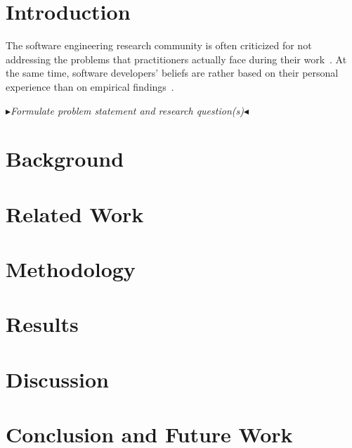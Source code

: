 \documentclass[
  pdftex,            %
  12pt,              %
  a4paper,           %
  parskip=relative,  %
  twoside,           %
  footinclude=false, %
  footheight=0mm,    %
  toc=bibliography,  %
  toc=listof         %
]{scrbook}           %
\theoremstyle{definitiontight}
\newcommand{\quotemarks}[1]{{\bfseries{#1}}}
\newenvironment{chapter-quotation}[1]
  {
    \begin{quotation}                     %
    \pushQED{#1}                          %
    \noindent                             %
    \slshape                              %
    \quotemarks{``}                       %
    \hspace{-2pt}                         %
  }
  {
    \hspace{-2pt}                         %
    \quotemarks{''}                       %
    \fontsize{10}{10}\normalfont\\{ }\\   %
    \hspace*{\fill}---\popQED             %
    \end{quotation}                       %
  }
\newcommand{\boxedtext}[1]{\fbox{\scriptsize\bfseries\textsf{#1}}}
\newcommand{\nota}[2]{
	\boxedtext{#1}
		{\small$\blacktriangleright$\emph{\textsl{#2}}$\blacktriangleleft$}
}
\newcommand{\todo}[1]{{\color{red}\nota{TODO}{#1}}}
\begin{document}

\chapter{Introduction}
\label{ch:introduction}



The software engineering research community is often criticized for not addressing the problems that practitioners actually face during their work~\cite{Briand2012}.
At the same time, software developers' beliefs are rather based on their personal experience than on empirical findings~\cite{DevanbuZimmermannOthers2016}.

\todo{Formulate problem statement and research question(s)}

\chapter{Background}
\label{ch:background}

\chapter{Related Work}
\label{ch:related-work}

\chapter{Methodology}
\label{ch:methodology}

\chapter{Results}
\label{ch:results}

\chapter{Discussion}
\label{ch:discussion}

\chapter{Conclusion and Future Work}
\label{ch:conclusion}
\end{document}
